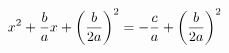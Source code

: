 \documentclass[preview]{standalone}
\begin{document}
\begin{align*}
\special{dvisvgm:raw <g id='unique000'>}x^2+\frac{b}{a}x+\left(\frac{b}{2a}\right)^2=-\frac{c}{a}+\left(\frac{b}{2a}\right)^2\special{dvisvgm:raw </g>}
\end{align*}
\end{document}
